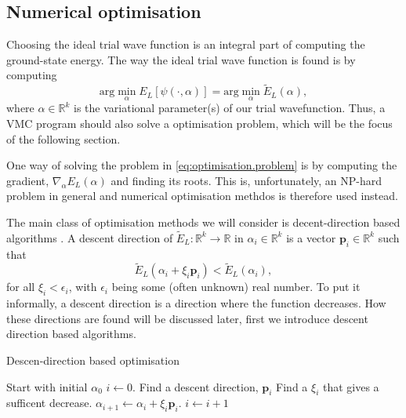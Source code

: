 \documentclass[11pt,a4paper]{article}
\numberwithin{equation}{section}
\begin{document}
\subsection{Numerical optimisation}
Choosing the ideal trial wave function is an integral part of computing the ground-state energy. The way the ideal trial wave function is found is by computing
\begin{equation}
    \text{arg} \min_{\alpha} E_L[\psi(\cdot, \alpha)] = \text{arg} \min_{\alpha} \tilde{E}_L(\alpha), \label{eq:optimisation.problem}
\end{equation}
where $\alpha \in \mathbb{R}^k$ is the variational parameter(s) of our trial wavefunction. Thus, a VMC program should also solve a optimisation problem, which will be the focus of the following section.

One way of solving the problem in \cref{eq:optimisation.problem} is by computing the gradient, $\nabla_\alpha E_L(\alpha)$ and finding its roots. This is, unfortunately, an NP-hard problem in general \cite{boyd.book} and numerical optimisation methdos is therefore used instead.

The main class of optimisation methods we will consider is decent-direction based algorithms \cite{nocedal.book}. A descent direction of $\tilde{E}_L: \mathbb{R}^k \to \mathbb{R}$ in $\alpha_i \in \mathbb{R}^k$ is a vector $\bm{p}_i \in \mathbb{R}^k$ such that
\begin{equation}
    \tilde{E}_L(\alpha_i + \xi_i \bm{p}_i) < \tilde{E}_L(\alpha_i),
\end{equation}
for all $\xi_i < \epsilon_i$, with $\epsilon_i$ being some (often unknown) real number. To put it informally, a descent direction is a direction where the function decreases. How these directions are found will be discussed later, first we introduce descent direction based algorithms.

\begin{algorithm}
	\caption{Descen-direction based optimisation}
	\label{Alg:descentOptimisation}
	\begin{algorithmic}[1]
        \State Start with initial $\alpha_0$
        \State $i \gets 0$.
        \State Find a descent direction, $\bm{p}_i$
        \State Find a $\xi_i$ that gives a sufficent decrease.
        \State $\alpha_{i+1} \gets \alpha_i + \xi_i \bm{p}_i$.
        \State $i \gets i + 1$
        \EndWhile
		\EndProcedure
	\end{algorithmic}
\end{algorithm}
\end{document}

